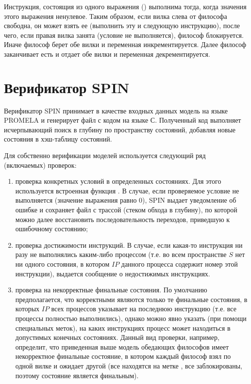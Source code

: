 Инструкция, состоящия из одного выражения ()
выполнима тогда, когда значения этого выражения ненулевое. Таким
образом, если вилка слева от философа свободна, он может взять ее
(выполнить эту и следующую инструкцию), после чего, если правая вилка
занята (условие  не выполняется),
философ блокируется. Иначе философ берет обе вилки и переменная
 инкрементируется. Далее философ заканчивает есть и
отдает обе вилки и переменная  декрементируется.

\section{Верификатор SPIN}
\label{sec:spin}

Верификатор SPIN принимает в качестве входных данных модель на языке
PROMELA и генерирует файл с кодом на языке С. Полученный код выполняет
исчерпывающий поиск в глубину по пространству состояний, добавляя
новые состояния в хэш-таблицу состояний. 

Для собственно верификации моделей используется следующий ряд
(включаемых) проверок:

\begin{enumerate}
\item проверка конкретных условий в определенных состояниях. Для этого
  используется встроенная функция . В случае, если
  проверяемое условие не выполняется (значение выражения равно 0),
  SPIN выдает уведомление об ошибке и сохраняет файл с трассой (стеком
  обхода в глубину), по которой можно далее восстановить
  последовательность переходов, приведшую к ошибочному состоянию;

\item проверка достижимости инструкций. В случае, если какая-то
  инструкция ни разу не выполнялись каким-либо процессом (т.е. во
  всем пространстве $S$ нет ни одного состояния, в котором $IP$
  данного процесса содержит номер этой инструкции), выдается сообщение
  о недостижимых инструкциях.

\item проверка на некорректные финальные состояния. По умолчанию
  предполагается, что корректными являются только те финальные
  состояния, в которых $IP$ всех процессов указывает на последнюю
  инструкцию (т.е. все процессы полностью выполнились), однако можно
  явно указать (при помощи специальных меток), на каких инструкциях
  процесс может находиться в допустимых конечных состояниях. Данный
  вид проверки, например, определит, что приведенная выше модель
  обедающих философов имеет некорректное финальные состояние, в
  котором каждый философ взял по одной вилке и ожидает другой (все
  находятся на метке , все заблокированы, поэтому
  состояние является финальным). 
\end{enumerate}

